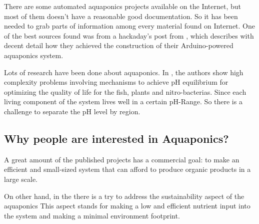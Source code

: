 There are some automated aquaponics projects available on the Internet,
but most of them doesn't have a reasonable good documentation.
So it has been needed to grab parts of information among every material found on Internet.
One of the best sources found was from a hackaday's post from \cite{gareth_coleman_aquapionics_2016},
which describes with decent detail how they achieved the construction of their Arduino-powered aquaponics system.

Lots of research have been done about aquaponics.
In \cite{goddek2015challenges}, the authors show high complexity problems involving mechanisms to achieve pH equilibrium for optimizing the quality of life for the fish, plants and nitro-bacterias.
Since each living component of the system lives well in a certain pH-Range.
So there is a challenge to separate the pH level by region.

\subsection{Why people are interested in Aquaponics?}

A great amount of the published projects has a commercial goal:
to make an efficient and small-sized system that can afford to produce organic products in a large scale.

On other hand,
in the \cite{goddek2015challenges} there is a try to address the sustainability aspect of the aquaponics
This aspect stands for making a low and efficient nutrient input into the system and making a minimal environment footprint.
